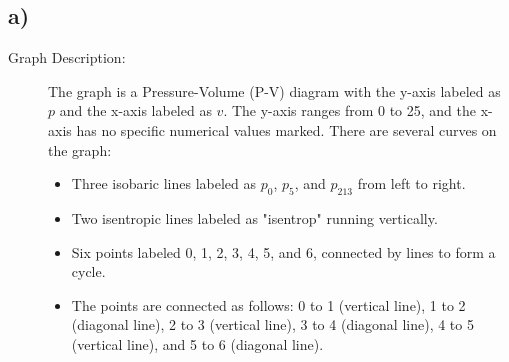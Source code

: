

\subsection*{a)}

\begin{description}
    \item[Graph Description:] The graph is a Pressure-Volume (P-V) diagram with the y-axis labeled as $p$ and the x-axis labeled as $v$. The y-axis ranges from 0 to 25, and the x-axis has no specific numerical values marked. There are several curves on the graph:
    \begin{itemize}
        \item Three isobaric lines labeled as $p_0$, $p_5$, and $p_{213}$ from left to right.
        \item Two isentropic lines labeled as "isentrop" running vertically.
        \item Six points labeled 0, 1, 2, 3, 4, 5, and 6, connected by lines to form a cycle.
        \item The points are connected as follows: 0 to 1 (vertical line), 1 to 2 (diagonal line), 2 to 3 (vertical line), 3 to 4 (diagonal line), 4 to 5 (vertical line), and 5 to 6 (diagonal line).
    \end{itemize}
\end{description}
